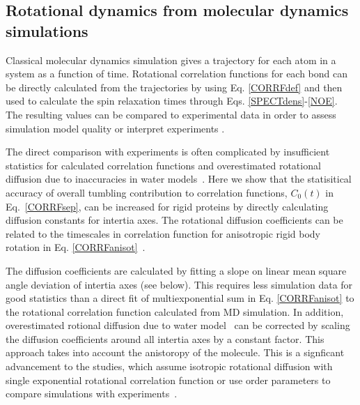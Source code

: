 \documentclass[pre,aps,floatfix,authordate1-4,twocolumn]{revtex4-1}
\begin{document}


\subsection{Rotational dynamics from molecular dynamics simulations}\label{MDanalysis}
Classical molecular dynamics simulation gives a trajectory for each atom in
a system as a function of time. Rotational correlation functions for each bond
can be directly calculated from the trajectories by using Eq. \ref{CORRFdef}
and then used to calculate the spin relaxation times through Eqs. \ref{SPECTdens}-\ref{NOE}.
The resulting values can be compared to experimental data in order to assess simulation model
quality \cite{best04,showalter07a,showalter07b,maragakis08,trbovic08,fisette12} or
interpret experiments \cite{fisette12}.

The direct comparison with experiments is often complicated by
insufficient statistics for calculated correlation functions and overestimated
rotational diffusion due to inaccuracies in water models~\cite{wong08,anderson12}.
Here we show that the statisitical accuracy of overall tumbling contribution to
correlation functions, $C_0(t)$ in Eq.~\ref{CORRFsep}, can be increased for
rigid proteins by directly calculating diffusion constants for intertia axes.
The rotational diffusion coefficients can be related to the timescales
in correlation function for anisotropic rigid body rotation
in Eq. \ref{CORRFanisot}~\cite{woessner62,Note1}.

The diffusion coefficients are calculated by fitting a slope on linear mean
square angle deviation of intertia axes (see below). This requires less simulation data
for good statistics than a direct fit of multiexponential sum in Eq. \ref{CORRFanisot}
to the rotational correlation function calculated from MD simulation.
In addition, overestimated rotional diffusion due to water model~\cite{wong08} can
be corrected by scaling the diffusion coefficients around all intertia axes
by a constant factor. This approach takes into account the anistoropy of
the molecule. This is a signficant advancement to the studies, which assume
isotropic rotational diffusion with single exponential rotational correlation
function \cite{showalter07a,showalter07b,maragakis08,gu14,allner15} or
use order parameters to compare simulations with experiments~\cite{gu14,maragakis08,trbovic08,best04}.
\end{document}
